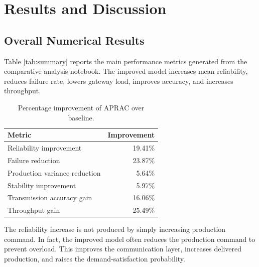 \documentclass[journal]{IEEEtran}
\begin{document}
\section{Results and Discussion}
\label{sec:results}

\subsection{Overall Numerical Results}

Table \ref{tab:summary} reports the main performance metrics generated from the comparative analysis notebook. The improved model increases mean reliability, reduces failure rate, lowers gateway load, improves accuracy, and increases throughput.

\begin{table}[H]
\centering
\caption{Baseline versus improved performance summary.}
\label{tab:summary}
\end{table}

\begin{table}[H]
\centering
\caption{Percentage improvement of APRAC over baseline.}
\label{tab:improvement}
\begin{tabular}{lr}
\toprule
Metric & Improvement \\
\midrule
Reliability improvement & 19.41\% \\
Failure reduction & 23.87\% \\
Production variance reduction & 5.64\% \\
Stability improvement & 5.97\% \\
Transmission accuracy gain & 16.06\% \\
Throughput gain & 25.49\% \\
\bottomrule
\end{tabular}
\end{table}

The reliability increase is not produced by simply increasing production command. In fact, the improved model often reduces the production command to prevent overload. This improves the communication layer, increases delivered production, and raises the demand-satisfaction probability.
\end{document}
